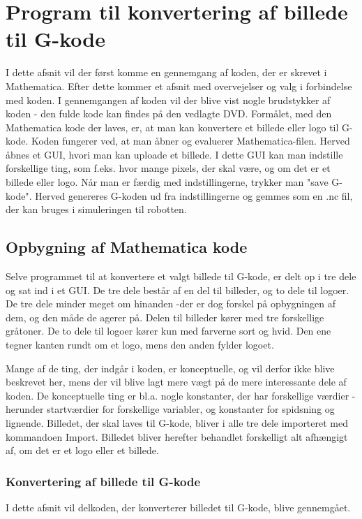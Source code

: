 \section{Program til konvertering af billede til G-kode}


I dette afsnit vil der først komme en gennemgang af koden, der er skrevet i Mathematica. Efter dette kommer et afsnit med overvejelser og valg i forbindelse med koden. I gennemgangen af koden vil der blive vist nogle brudstykker af koden - den fulde kode kan findes på den vedlagte DVD. Formålet, med den Mathematica kode der laves, er, at man kan konvertere et billede eller logo til G-kode. Koden fungerer ved, at man åbner og evaluerer Mathematica-filen. Herved åbnes et GUI, hvori man kan uploade et billede. I dette GUI kan man indstille forskellige ting, som f.eks. hvor mange pixels, der skal være, og om det er et billede eller logo. Når man er færdig med indstillingerne, trykker man "save G-kode". Herved genereres G-koden ud fra indstillingerne og gemmes som en .nc fil, der kan bruges i simuleringen til robotten.
\subsection{Opbygning af Mathematica kode}
Selve programmet til at konvertere et valgt billede til G-kode, er delt op i tre dele og sat ind i et GUI. De tre dele består af en del til billeder, og to dele til logoer. De tre dele minder meget om hinanden -der er dog forskel på opbygningen af dem, og den måde de agerer på. Delen til billeder kører med tre forskellige gråtoner. De to dele til logoer kører kun med farverne sort og hvid. Den ene tegner kanten rundt om et logo, mens den anden fylder logoet.

Mange af de ting, der indgår i koden, er konceptuelle, og vil derfor ikke blive beskrevet her, mens der vil blive lagt mere vægt på de mere interessante dele af koden. De konceptuelle ting er bl.a. nogle konstanter, der har forskellige værdier - herunder startværdier for forskellige variabler, og konstanter for spidsning og lignende. Billedet, der skal laves til G-kode, bliver i alle tre dele importeret med kommandoen Import. Billedet bliver herefter behandlet forskelligt alt afhængigt af, om det er et logo eller et billede.
\subsubsection{Konvertering af billede til G-kode}
I dette afsnit vil delkoden, der konverterer billedet til G-kode, blive gennemgået.

